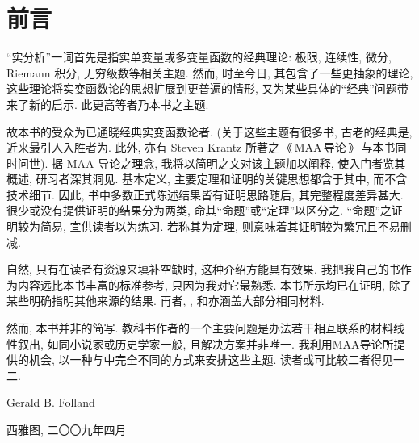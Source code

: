 \chapter*{前言}
``实分析''一词首先是指实单变量或多变量函数的经典理论: 极限, 连续性, 微分, Riemann 积分, 无穷级数等相关主题. 然而, 时至今日, 其包含了一些更抽象的理论, 这些理论将实变函数论的思想扩展到更普遍的情形, 又为某些具体的``经典''问题带来了新的启示. 此更高等者乃本书之主题.

故本书的受众为已通晓经典实变函数论者. (关于这些主题有很多书, 古老的经典是\cite{rudin1976principles}, 近来最引人入胜者为\cite{korner2004companion}. 此外, 亦有 Steven Krantz 所著之\,《\,MAA\,导论\,》\,\cite{krantz2014guide}与本书同时问世). 据 MAA 导论之理念, 我将以简明之文对该主题加以阐释, 使入门者览其概述, 研习者深其洞见. 基本定义, 主要定理和证明的关键思想都含于其中, 而不含技术细节. 因此, 书中多数正式陈述结果皆有证明思路随后, 其完整程度差异甚大. 很少或没有提供证明的结果分为两类, 命其``命题''或``定理''以区分之. ``命题''之证明较为简易, 宜供读者以为练习. 若称其为定理, 则意味着其证明较为繁冗且不易删减.

自然, 只有在读者有资源来填补空缺时, 这种介绍方能具有效果. 我把我自己的书\cite{folland1999real}作为内容远比本书丰富的标准参考, 只因为我对它最熟悉. 本书所示均已在\cite{folland1999real}证明, 除了某些明确指明其他来源的结果. 再者, \cite{lang2012real}, \cite{royden1988real}和\cite{rudin1987realcomplex}亦涵盖大部分相同材料.

然而, 本书并非\cite{folland1999real}的简写. 教科书作者的一个主要问题是办法若干相互联系的材料线性叙出, 如同小说家或历史学家一般, 且解决方案并非唯一. 我利用MAA导论所提供的机会, 以一种与\cite{folland1999real}中完全不同的方式来安排这些主题. 读者或可比较二者得见一二.

\begin{flushright}
    {Gerald B. Folland}\par\kaishu 西雅图, 二〇〇九年四月
\end{flushright}